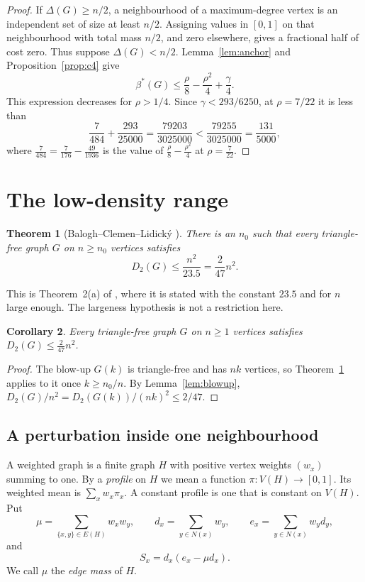 \documentclass[11pt,reqno]{amsart}
\theoremstyle{plain}
\newtheorem{theorem}{Theorem}[section]
\newtheorem{corollary}[theorem]{Corollary}
\newcommand{\Nb}{N}
\newcommand{\optf}{\beta^{*}}
\newcommand{\dens}{\rho}
\begin{document}
\begin{proof}
If $\Delta(G)\ge n/2$, a neighbourhood of a maximum-degree vertex is an
independent set of size at least $n/2$.  Assigning values in $[0,1]$ on that
neighbourhood with total mass $n/2$, and zero elsewhere, gives a fractional
half of cost zero.  Thus suppose $\Delta(G)<n/2$.  Lemma~\ref{lem:anchor} and
Proposition~\ref{prop:c4} give
\[
 \optf(G)\le\frac{\dens}8-\frac{\dens^{2}}{4}+\frac\gamma4.
\]
This expression decreases for $\dens>1/4$.  Since $\gamma<293/6250$, at
$\dens=7/22$ it is less than
\[
 \frac7{484}+\frac{293}{25000}
 =\frac{79203}{3025000}<\frac{79255}{3025000}=\frac{131}{5000},
\]
where $\frac7{484}=\frac7{176}-\frac{49}{1936}$ is the value of
$\frac\dens8-\frac{\dens^{2}}4$ at $\dens=\frac7{22}$.
\end{proof}

\section{The low-density range}\label{sec:low}

\begin{theorem}[Balogh--Clemen--Lidick\'y \cite{bcl}]\label{thm:bcl-large}
There is an $n_0$ such that every triangle-free graph $G$ on $n\ge n_0$
vertices satisfies
\[
 D_2(G)\le\frac{n^{2}}{23.5}=\frac2{47}n^{2}.
\]
\end{theorem}

This is Theorem~2(a) of \cite{bcl}, where it is stated with
the constant $23.5$ and for $n$ large enough.  The largeness hypothesis is not
a restriction here.

\begin{corollary}\label{cor:bcl}
Every triangle-free graph $G$ on $n\ge1$ vertices satisfies
$D_2(G)\le\frac2{47}n^{2}$.
\end{corollary}

\begin{proof}
The blow-up $G(k)$ is triangle-free and has $nk$ vertices, so
Theorem~\ref{thm:bcl-large} applies to it once $k\ge n_0/n$.  By
Lemma~\ref{lem:blowup}, $D_2(G)/n^{2}=D_2(G(k))/(nk)^{2}\le2/47$.
\end{proof}

\subsection{A perturbation inside one neighbourhood}
A weighted graph is a finite graph $H$ with positive vertex weights
$(w_x)$ summing to one.  By a \emph{profile} on $H$ we mean a function
$\pi:V(H)\to[0,1]$.  Its weighted mean is $\sum_xw_x\pi_x$.  A constant profile
is one that is constant on $V(H)$.  Put
\[
 \mu=\sum_{\{x,y\}\in E(H)}w_xw_y,\qquad
 d_x=\sum_{y\in\Nb(x)}w_y,\qquad
 e_x=\sum_{y\in\Nb(x)}w_yd_y,
\]
and
\[
 S_x=d_x(e_x-\mu d_x).
\]
We call $\mu$ the \emph{edge mass} of $H$.
\end{document}
